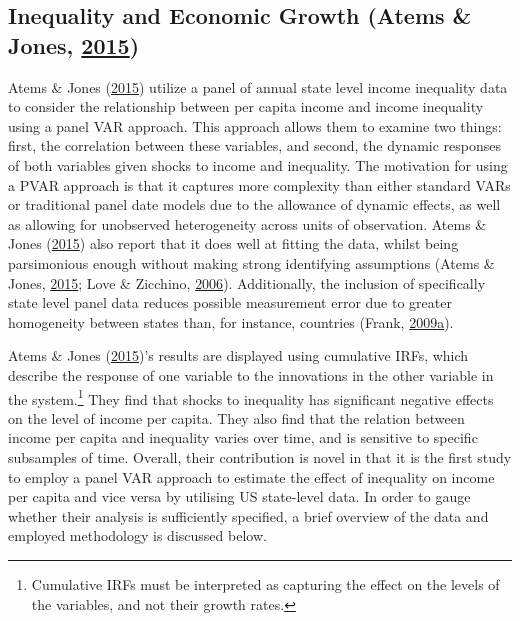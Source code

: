 \documentclass[11pt,preprint, authoryear]{elsarticle}
\numberwithin{equation}{section}
\numberwithin{figure}{section}
\numberwithin{table}{section}
\let\rmarkdownfootnote\footnote%
\def\footnote{\protect\rmarkdownfootnote}
\begin{document}
\hypertarget{inequality-and-economic-growth-atems}{%
\subsection{\texorpdfstring{Inequality and Economic Growth (Atems \&
Jones, \protect\hyperlink{ref-atems}{2015})
\label{Section 2.2}}{Inequality and Economic Growth (Atems \& Jones, 2015) }}\label{inequality-and-economic-growth-atems}}

Atems \& Jones (\protect\hyperlink{ref-atems}{2015}) utilize a panel of
annual state level income inequality data to consider the relationship
between per capita income and income inequality using a panel VAR
approach. This approach allows them to examine two things: first, the
correlation between these variables, and second, the dynamic responses
of both variables given shocks to income and inequality. The motivation
for using a PVAR approach is that it captures more complexity than
either standard VARs or traditional panel date models due to the
allowance of dynamic effects, as well as allowing for unobserved
heterogeneity across units of observation. Atems \& Jones
(\protect\hyperlink{ref-atems}{2015}) also report that it does well at
fitting the data, whilst being parsimonious enough without making strong
identifying assumptions (Atems \& Jones,
\protect\hyperlink{ref-atems}{2015}; Love \& Zicchino,
\protect\hyperlink{ref-love}{2006}). Additionally, the inclusion of
specifically state level panel data reduces possible measurement error
due to greater homogeneity between states than, for instance, countries
(Frank,
\protect\hyperlink{ref-frank}{2009}\protect\hyperlink{ref-frank}{a}).

Atems \& Jones (\protect\hyperlink{ref-atems}{2015})'s results are
displayed using cumulative IRFs, which describe the response of one
variable to the innovations in the other variable in the
system.\footnote{Cumulative IRFs must be interpreted as capturing the
  effect on the levels of the variables, and not their growth rates.}
They find that shocks to inequality has significant negative effects on
the level of income per capita. They also find that the relation between
income per capita and inequality varies over time, and is sensitive to
specific subsamples of time. Overall, their contribution is novel in
that it is the first study to employ a panel VAR approach to estimate
the effect of inequality on income per capita and vice versa by
utilising US state-level data. In order to gauge whether their analysis
is sufficiently specified, a brief overview of the data and employed
methodology is discussed below.
\end{document}
